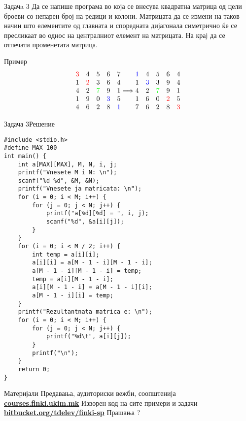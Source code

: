 \begin{frame}{Задачa 3}
Да се напише програма во која се внесува квадратна матрица од цели броеви со
непарен број на редици и колони. Матрицата да се измени на таков начин што
елементите од главната и споредната дијагонала симетрично ќе се пресликаат во
однос на централниот елемент на матрицата. На крај да се отпечати променетата
матрица.
\begin{exampleblock}{Пример}
\[
 \begin{matrix}
 \color{red}{3} & 4 & 5 & 6 & 7\\ 
 1 & \color{red}{2} & 3 & 6 & 4\\
 4 & 2 & \color{green}{7} & 9 & 1\\
 1 & 9 & 0 & \color{blue}{3} & 5\\ 
 4 & 6 & 2 & 8 & \color{blue}{1}
 \end{matrix}
 \Longrightarrow
 \begin{matrix}
    \color{blue}{1} & 4 & 5 & 6 & 4\\ 
    1 & \color{blue}{3} & 3 & 9 & 4\\
    4 & 2 & \color{green}{7} & 9 & 1\\
    1 & 6 & 0 & \color{red}{2} & 5\\ 
    7 & 6 & 2 & 8 & \color{red}{3}
 \end{matrix}
\]
\end{exampleblock}
\end{frame}

\begin{frame}[fragile,shrink=5]{Задача 3}{Решение}
\begin{lstlisting}
#include <stdio.h>
#define MAX 100
int main() {
    int a[MAX][MAX], M, N, i, j;
    printf("Vnesete M i N: \n");
    scanf("%d %d", &M, &N);
    printf("Vnesete ja matricata: \n");
    for (i = 0; i < M; i++) {
        for (j = 0; j < N; j++) {
            printf("a[%d][%d] = ", i, j);
            scanf("%d", &a[i][j]);
        }
    }
    for (i = 0; i < M / 2; i++) {
        int temp = a[i][i];
        a[i][i] = a[M - 1 - i][M - 1 - i];
        a[M - 1 - i][M - 1 - i] = temp;
        temp = a[i][M - 1 - i];
        a[i][M - 1 - i] = a[M - 1 - i][i];
        a[M - 1 - i][i] = temp;
    }
    printf("Rezultantnata matrica e: \n");
    for (i = 0; i < M; i++) {
        for (j = 0; j < N; j++) {
            printf("%d\t", a[i][j]);
        }
        printf("\n");
    }
    return 0;
}
\end{lstlisting}
\end{frame}

\begin{frame}{Материјали}{}
	Предавања, аудиториски вежби, соопштенија\\
	\href{http://courses.finki.ukim.mk/}{\textbf{courses.finki.ukim.mk}}
	\vfill
	Изворен код на сите примери и задачи\\
	\href{http://bitbucket.org/tdelev/finki-sp/}{\textbf{bitbucket.org/tdelev/finki-sp}}
	\vfill
	{\Huge Прашања ?}
\end{frame}
